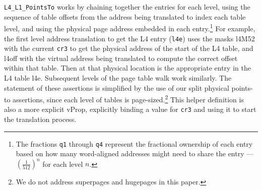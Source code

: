 \lstinline|L4_L1_PointsTo| works by
chaining together the entries for each level, using the sequence of table offsets from the address being translated to index
each table level, and using the physical page address embedded in each entry.\footnote{
  The fractions \lstinline|q1| through \lstinline|q4| represent the fractional ownership of each entry based on how many
  word-aligned addresses might need to share the entry ---  $(\frac{1}{512})^n$ for each level $n$.
}
For example, 
  the first level address translation to get the L4 entry (\lstinline|l4e|) 
  uses the masks \textsf{l4M52} with the current \lstinline|cr3| to get the 
  physical address of the start of the L4 table,
  and \textsf{l4off} with the virtual address being translated to compute the correct offset within that table.
  Then at that physical location is the appropriate entry in the L4 table \textsf{l4e}.
  Subsequent levels of the page table walk work similarly.
The statement of these assertions is simplified by the use of our split physical points-to assertions, since
each level of tables is page-sized.\footnote{We do not address superpages and hugepages in this paper.}
This helper definition is also a more explicit \textsf{vProp}, explicitly binding a value for \lstinline|cr3| and using it
to start the translation process.


